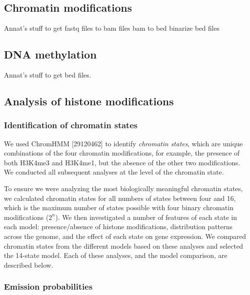 \documentclass[10pt,letterpaper]{article}
\begin{document}
\hypertarget{chromatin-modifications}{%
\subsection{Chromatin modifications}\label{chromatin-modifications}}

Annat's stuff to get fastq files to bam files bam to bed binarize bed
files

\hypertarget{dna-methylation}{%
\subsection{DNA methylation}\label{dna-methylation}}

Annat's stuff to get bed files.

\hypertarget{analysis-of-histone-modifications}{%
\subsection{Analysis of histone
modifications}\label{analysis-of-histone-modifications}}

\hypertarget{identification-of-chromatin-states}{%
\subsubsection{Identification of chromatin
states}\label{identification-of-chromatin-states}}

We used ChromHMM {[}29120462{]} to identify \emph{chromatin states},
which are unique combinations of the four chromatin modifications, for
example, the presence of both H3K4me3 and H3K4me1, but the absence of
the other two modifications. We conducted all subsequent analyses at the
level of the chromatin state.

To ensure we were analyzing the most biologically meaningful chromatin
states, we calculated chromatin states for all numbers of states between
four and 16, which is the maximum number of states possible with four
binary chromatin modifications (\(2^n\)). We then investigated a number
of features of each state in each model: presence/absence of histone
modifications, distribution patterns across the genome, and the effect
of each state on gene expression. We compared chromatin states from the
different models based on these analyses and selected the 14-state
model. Each of these analyses, and the model comparison, are described
below.

\hypertarget{emission-probabilities}{%
\subsubsection{Emission probabilities}\label{emission-probabilities}}
\end{document}
